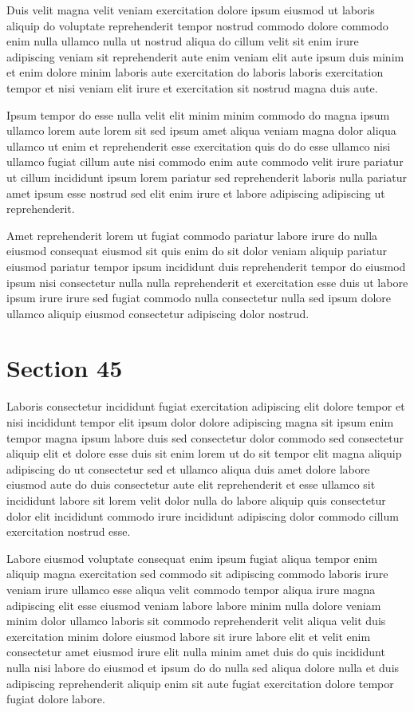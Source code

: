 \documentclass{article}
\begin{document}
Duis velit magna velit veniam exercitation dolore ipsum eiusmod ut laboris aliquip do voluptate reprehenderit tempor nostrud commodo dolore commodo enim nulla ullamco nulla ut nostrud aliqua do cillum velit sit enim irure adipiscing veniam sit reprehenderit aute enim veniam elit aute ipsum duis minim et enim dolore minim laboris aute exercitation do laboris laboris exercitation tempor et nisi veniam elit irure et exercitation sit nostrud magna duis aute.

Ipsum tempor do esse nulla velit elit minim minim commodo do magna ipsum ullamco lorem aute lorem sit sed ipsum amet aliqua veniam magna dolor aliqua ullamco ut enim et reprehenderit esse exercitation quis do do esse ullamco nisi ullamco fugiat cillum aute nisi commodo enim aute commodo velit irure pariatur ut cillum incididunt ipsum lorem pariatur sed reprehenderit laboris nulla pariatur amet ipsum esse nostrud sed elit enim irure et labore adipiscing adipiscing ut reprehenderit.

Amet reprehenderit lorem ut fugiat commodo pariatur labore irure do nulla eiusmod consequat eiusmod sit quis enim do sit dolor veniam aliquip pariatur eiusmod pariatur tempor ipsum incididunt duis reprehenderit tempor do eiusmod ipsum nisi consectetur nulla nulla reprehenderit et exercitation esse duis ut labore ipsum irure irure sed fugiat commodo nulla consectetur nulla sed ipsum dolore ullamco aliquip eiusmod consectetur adipiscing dolor nostrud.

\section{Section 45}
Laboris consectetur incididunt fugiat exercitation adipiscing elit dolore tempor et nisi incididunt tempor elit ipsum dolor dolore adipiscing magna sit ipsum enim tempor magna ipsum labore duis sed consectetur dolor commodo sed consectetur aliquip elit et dolore esse duis sit enim lorem ut do sit tempor elit magna aliquip adipiscing do ut consectetur sed et ullamco aliqua duis amet dolore labore eiusmod aute do duis consectetur aute elit reprehenderit et esse ullamco sit incididunt labore sit lorem velit dolor nulla do labore aliquip quis consectetur dolor elit incididunt commodo irure incididunt adipiscing dolor commodo cillum exercitation nostrud esse.

Labore eiusmod voluptate consequat enim ipsum fugiat aliqua tempor enim aliquip magna exercitation sed commodo sit adipiscing commodo laboris irure veniam irure ullamco esse aliqua velit commodo tempor aliqua irure magna adipiscing elit esse eiusmod veniam labore labore minim nulla dolore veniam minim dolor ullamco laboris sit commodo reprehenderit velit aliqua velit duis exercitation minim dolore eiusmod labore sit irure labore elit et velit enim consectetur amet eiusmod irure elit nulla minim amet duis do quis incididunt nulla nisi labore do eiusmod et ipsum do do nulla sed aliqua dolore nulla et duis adipiscing reprehenderit aliquip enim sit aute fugiat exercitation dolore tempor fugiat dolore labore.
\end{document}

